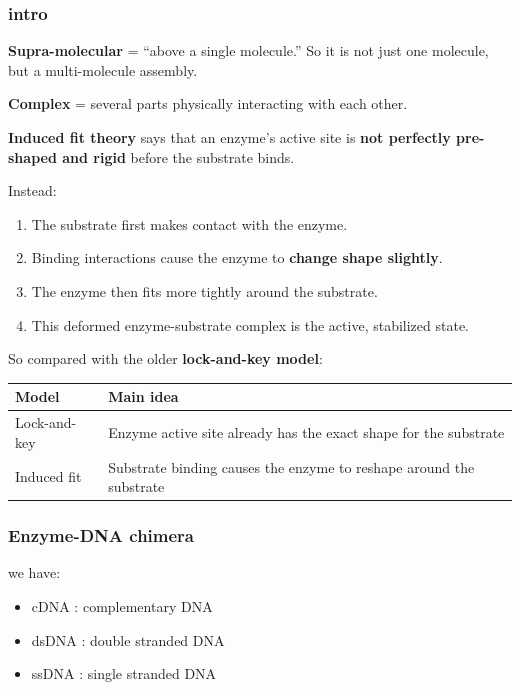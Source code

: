 \documentclass{article}
\begin{document}
\subsubsection{intro}
\begin{definition}
  
\textbf{Supra-molecular} = ``above a single molecule.'' So it is not just one molecule, but a multi-molecule assembly.

\textbf{Complex} = several parts physically interacting with each other.
\end{definition}

\begin{theorem}
\textbf{Induced fit theory} says that an enzyme's active site is \textbf{not perfectly pre-shaped and rigid} before the substrate binds.
\end{theorem}

Instead:
\begin{enumerate}
  \item The substrate first makes contact with the enzyme. 
  \item Binding interactions cause the enzyme to \textbf{change shape slightly}.
  \item The enzyme then fits more tightly around the substrate.
  \item This deformed enzyme-substrate complex is the active, stabilized state.
\end{enumerate}

So compared with the older \textbf{lock-and-key model}:

\begin{table}[H]\noindent\begin{tabularx}{\linewidth}{LL}
\hline
\textbf{Model} & \textbf{Main idea} \\
\hline
Lock-and-key & Enzyme active site already has the exact shape for the substrate \\
\hline
Induced fit & Substrate binding causes the enzyme to reshape around the substrate \\
\hline
\end{tabularx}\end{table}

\subsubsection{Enzyme-DNA chimera}
\begin{definition}
we have:
\begin{itemize}
  \item cDNA : complementary DNA
  \item dsDNA : double stranded DNA
  \item ssDNA : single stranded DNA
\end{itemize}
\end{definition}
\end{document}
